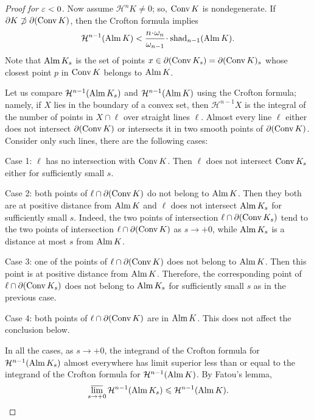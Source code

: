 \documentclass[a4paper,10pt]{article}
\begin{document}
\begin{proof}[Proof for $\varepsilon<0$]
Now assume $\mathcal H^n K\ne 0$; so, $\mathop{\rm Conv} K$ is nondegenerate.
If $\partial K\z{\not\supset} \partial(\conv K)$, then the Crofton formula implies
\[
\mathcal H^{n-1} (\cont K) < \frac{n\cdot\omega_n}{\omega_{n-1}}\cdot \fav_{n-1}(\cont K).
\]
Note that $\mathop{\rm Alm} K_s$ is the set of points $x\in \partial(\mathop{\rm Conv} K_s)=\partial (\mathop{\rm Conv} K)_s$ whose closest point $p$ in $\mathop{\rm Conv} K$ belongs to $\mathop{\rm Alm} K$.

Let us compare $\mathcal H^{n-1}(\mathop{\rm Alm} K_s)$ and $\mathcal H^{n-1}(\mathop{\rm Alm} K)$ using the Crofton formula;
namely, if $X$ lies in the boundary of a convex set, then $\mathcal H^{n-1} X$ is the integral of the number of points in $X\cap \ell$ over straight lines $\ell$.
Almost every line $\ell$ either does not intersect $\partial(\mathop{\rm Conv} K)$ or intersects it in two smooth points of $\partial(\mathop{\rm Conv} K)$.
Consider only such lines, there are the following cases:

Case 1: $\ell$ has no intersection with $\mathop{\rm Conv} K$.
Then $\ell$ does not intersect $\mathop{\rm Conv} K_s$ either for sufficiently small $s$.

Case 2: both points of $\ell\cap\partial(\mathop{\rm Conv} K)$ do not belong to $\mathop{\rm Alm} K$.
Then they both are at positive distance from $\mathop{\rm Alm} K$ and $\ell$ does not intersect $\mathop{\rm Alm} K_s$ for sufficiently small $s$.
Indeed, the two points of intersection $\ell\cap\partial(\mathop{\rm Conv} K_s)$ tend to the two points of intersection $\ell\cap \partial(\mathop{\rm Conv} K)$ as $s\to+0$, while $\mathop{\rm Alm} K_s$ is a distance at most $s$ from $\mathop{\rm Alm} K$.

Case 3: one of the points of $\ell\cap\partial(\mathop{\rm Conv} K)$ does not belong to $\mathop{\rm Alm} K$.
Then this point is at positive distance from $\mathop{\rm Alm} K$.
Therefore, the corresponding point of $\ell\cap \partial(\mathop{\rm Conv} K_s)$ does not belong to $\mathop{\rm Alm} K_s$ for sufficiently small $s$ as in the previous case.

Case 4: both points of $\ell\cap\partial(\mathop{\rm Conv} K)$ are in $\mathop{\rm Alm} K$.
This does not affect the conclusion below.

In all the cases, as $s\to +0$, the integrand of the Crofton formula for $\mathcal H^{n-1}(\mathop{\rm Alm} K_s)$ almost everywhere has limit superior less than or equal to the integrand of the Crofton formula for $\mathcal H^{n-1}(\mathop{\rm Alm} K)$.
By Fatou's lemma,
\[\varlimsup_{s\to +0} \mathcal H^{n-1}(\mathop{\rm Alm} K_s) \leqslant \mathcal H^{n-1}(\mathop{\rm Alm} K).\]



\end{proof}
\end{document}
